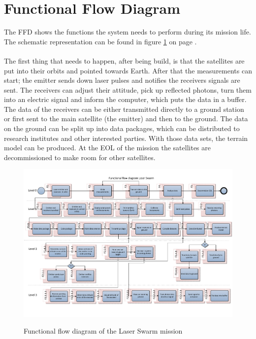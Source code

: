\section{Functional Flow Diagram}
\label{section_FFD}
The \ac{FFD} shows the functions the system needs to perform during its mission life. The schematic representation can be found in figure \ref{pic_FFD} on page \pageref{pic_FFD}.
\\ \\
The first thing that needs to happen, after being build, is that the satellites are put into their orbits and pointed towards Earth. After that the measurements can start; the emitter sends down laser pulses and notifies the receivers signals are sent. The receivers can adjust their attitude, pick up reflected photons, turn them into an electric signal and inform the computer, which puts the data in a buffer. The data of the receivers can be either transmitted directly to a ground station or first sent to the main satellite (the emitter) and then to the ground. The data on the ground can be split up into data packages, which can be distributed to research institutes and other interested parties. With those data sets, the terrain model can be produced. At the \ac{EOL} of the mission the satellites are decommissioned to make room for other satellites.

\begin{figure}
\includegraphics[scale=0.7, angle=90]{chapters/img/pic_FFD.pdf}
\label{pic_FFD}
\caption{Functional flow diagram of the Laser Swarm mission}
\end{figure}

